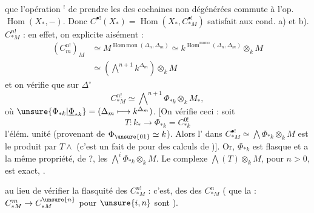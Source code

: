  que l'opération $^{!}$ de prendre les  des cochaines non dégénérées commute à l'op. $\operatorname{Hom}(X_*,-)$. Donc $C^{\bullet!}(X_*)=\operatorname{Hom}(X_*,C_{*M}^{\bullet!})$ satisfait aux cond. a) et b).  $C_{*M}^{n!}$  : en effet, on explicite aisément :
\[
\begin{aligned}
 (C_m^{n!})_M&\simeq M^{\operatorname{Hom\,mon}(\Delta_n,\Delta_m)}
 \simeq k^{\operatorname{Hom}^{\mathrm{mono}}(\Delta_n,\Delta_m)}\otimes_k M\\
 &\simeq(\bigwedge\nolimits^{n+1} k^{\Delta_m})\otimes_k M
\end{aligned}
\]
et on vérifie que  sur $\Delta^\circ$
\[
 C_{*M}^{n!}\simeq\bigwedge\nolimits^{n+1}\Phi_{*k}\otimes_k M_*,
\]
où $\unsure{\Phi_{*k}|\underline{\Phi}_{*k}}=(\Delta_m\longmapsto k^{\Delta_m})$. [On vérifie   ceci : soit
\[
 T\colon k_*\longrightarrow\Phi_{*k}=C_{*k}^{0!}
\]
l'élém. unité (provenant de $\Phi_{\unsure{01}}\simeq k$). Alors l' dans $C_{*M}^{\bullet!}\simeq\bigwedge\Phi_{*k}\otimes_k M$ est le produit par $T\wedge$ (c'est un fait de   pour des calculs de )]. Or, $\Phi_{*k}$ est flasque et a la même propriété, de  ?, les  $\bigwedge^i\Phi_{*k}\otimes_k M$. Le complexe $\bigwedge(T)\otimes_k M$, pour $n>0$, est  exact, .

 au lieu de vérifier la flasquité des $C_{*M}^{n!}$ : c'est,    des  des $C_{*M}^n$ ( que la    : $C_{*M}^m\to C_{*M}^{\unsure{n}}$ pour $\unsure{i,n}$ sont ).


